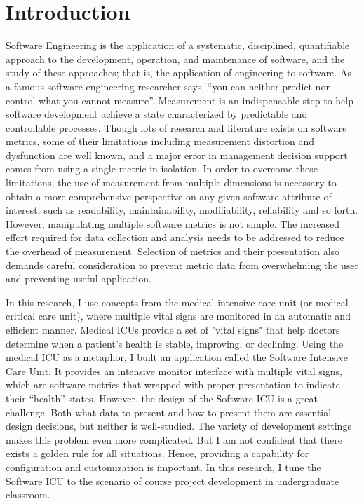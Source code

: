 
\chapter{Introduction}
Software Engineering is the application of a systematic, disciplined, quantifiable approach to the development, operation, and maintenance of software, and the study of these approaches; that is, the application of engineering to software\cite{se-def}. As a famous software engineering researcher says, ``you can neither predict nor control what you cannot measure''\cite{DeMarco}. Measurement is an indispensable step to help software development achieve a state characterized by predictable and controllable processes. Though lots of research and literature exists on software metrics, some of their limitations including measurement distortion and dysfunction are well known, and a major error in management decision support comes from using a single metric in isolation. In order to overcome these limitations, the use of measurement from multiple dimensions is necessary to obtain a more comprehensive perspective on any given software attribute of interest, such as readability, maintainability, modifiability, reliability and so forth\cite{metrics2004}\cite{multidimension2001}. However, manipulating multiple software metrics is not simple. The increased effort required for data collection and analysis needs to be addressed to reduce the overhead of measurement. Selection of metrics and their presentation also demands careful consideration to prevent metric data from overwhelming the user and preventing useful application. 

In this research, I use concepts from the medical intensive care unit (or medical critical care unit), where multiple vital signs are monitored in an automatic and efficient manner. Medical ICUs provide a set of "vital signs" that help doctors determine when a patient's health is stable, improving, or declining. Using the medical ICU as a metaphor, I built an application called the Software Intensive Care Unit. It provides an intensive monitor interface with multiple vital signs, which are software metrics that wrapped with proper presentation to indicate their ``health'' states. However, the design of the Software ICU is a great challenge. Both what data to present and how to present them are essential design decisions, but neither is well-studied. The variety of development settings makes this problem even more complicated. But I am not confident that there exists a golden rule for all situations. Hence, providing a capability for configuration and customization is important. In this research, I tune the Software ICU to the scenario of course project development in undergraduate classroom.

